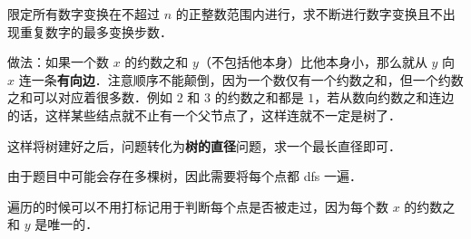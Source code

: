 限定所有数字变换在不超过 $n$ 的正整数范围内进行，求不断进行数字变换且不出现重复数字的最多变换步数．

做法：如果一个数 $x$ 的约数之和 $y$（不包括他本身）比他本身小，那么就从 $y$ 向 $x$ 连一条\textbf{有向边}．注意顺序不能颠倒，因为一个数仅有一个约数之和，但一个约数之和可以对应着很多数．例如 $2$ 和 $3$ 的约数之和都是 $1$，若从数向约数之和连边的话，这样某些结点就不止有一个父节点了，这样连就不一定是树了．

这样将树建好之后，问题转化为\textbf{树的直径}问题，求一个最长直径即可．

由于题目中可能会存在多棵树，因此需要将每个点都 dfs 一遍．

遍历的时候可以不用打标记用于判断每个点是否被走过，因为每个数 $x$ 的约数之和 $y$ 是唯一的．